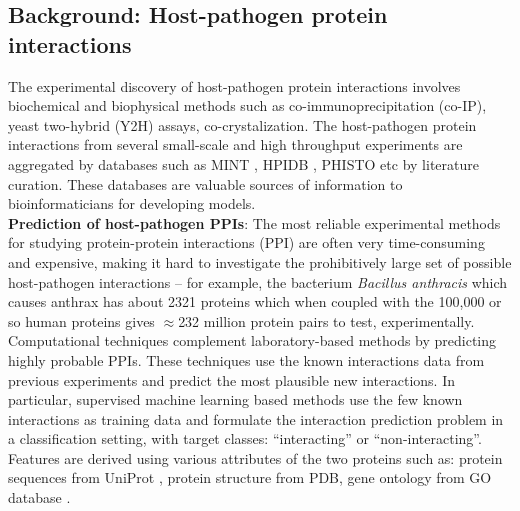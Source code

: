 \documentclass{bioinfo}
\begin{document}
\subsection{Background: Host-pathogen protein interactions}
The experimental discovery of host-pathogen protein interactions involves biochemical and biophysical methods such as co-immunoprecipitation (co-IP), yeast two-hybrid (Y2H) assays, co-crystalization. The host-pathogen protein interactions from several small-scale and high throughput experiments are aggregated by databases such as MINT \citep{virusmint}, HPIDB \citep{hpidb}, PHISTO \citep{phisto} etc by literature curation. These databases are valuable sources of information to bioinformaticians for developing models. \\

\noindent\textbf{Prediction of host-pathogen PPIs}: The most reliable experimental methods for studying protein-protein interactions (PPI) are often very time-consuming and expensive, making it hard to investigate the prohibitively large set of possible host-pathogen interactions -- for example, the bacterium \textit{Bacillus anthracis} which causes anthrax has about 2321 proteins which when coupled with the 100,000 or so human proteins gives $\approx$232 million protein pairs to test, experimentally. Computational techniques complement laboratory-based methods by predicting highly probable PPIs. These techniques use the known interactions data from previous experiments and predict the most plausible new interactions. In particular, supervised machine learning based methods use the few known interactions as training data and formulate the interaction prediction problem in a classification setting, with target classes: ``interacting'' or ``non-interacting''. Features are derived using various attributes of the two proteins such as: protein sequences from UniProt \citep{UniProt}, protein structure from PDB, gene ontology from GO database \citep{GO}.
\end{document}
